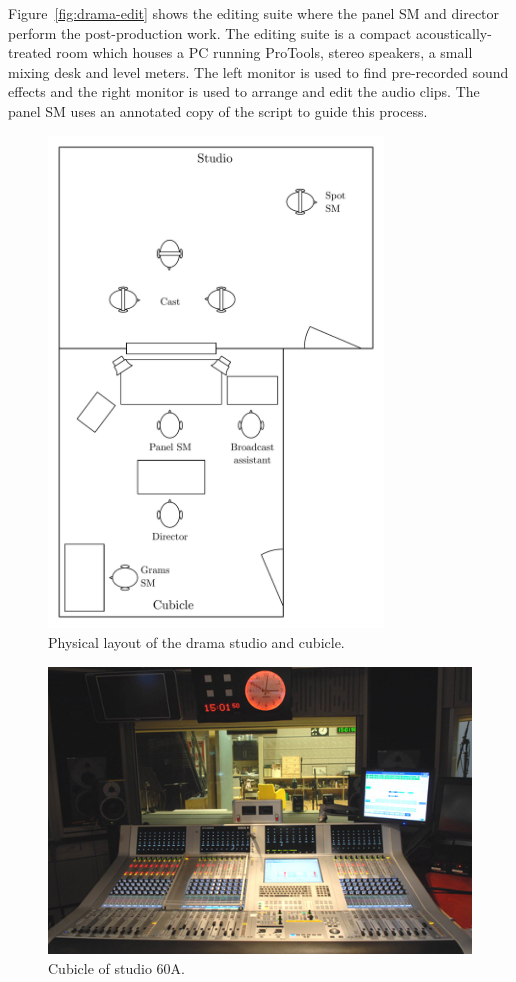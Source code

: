 Figure~\ref{fig:drama-edit} shows the editing suite where the panel SM and director perform the post-production work.
The editing suite is a compact acoustically-treated room which houses a PC running ProTools, stereo speakers, a small
mixing desk and level meters.  The left monitor is used to find pre-recorded sound effects and the right monitor is
used to arrange and edit the audio clips. The panel SM uses an annotated copy of the script to guide this process.

\begin{figure}
  \centering
  \includegraphics[width=3.5in]{figs/drama-layout.pdf}
  \caption{Physical layout of the drama studio and cubicle.}
  \label{fig:drama-layout}
\end{figure}

\begin{figure}
  \centering
  \includegraphics[width=\columnwidth]{figs/60a.jpg}
  \caption{Cubicle of studio 60A.}
  \label{fig:drama-studio}
\end{figure}

